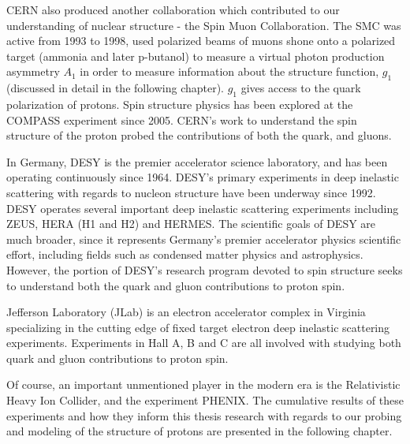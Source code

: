 CERN also produced another collaboration which contributed to our understanding
of nuclear structure - the Spin Muon Collaboration. The SMC was active from 1993
to 1998, used polarized beams of muons shone onto a polarized target (ammonia
and later p-butanol) to measure a virtual photon production asymmetry $A_1$ in
order to measure information about the structure function, $g_1$ (discussed in
detail in the following chapter). $g_1$ gives access to the quark polarization
of protons. Spin structure physics has been explored at the COMPASS experiment
since 2005. CERN's work to understand the spin structure of the proton probed
the contributions of both the quark, and gluons. 

In Germany, DESY is the premier accelerator science laboratory, and has been
operating continuously since 1964. DESY's primary experiments in deep inelastic
scattering with regards to nucleon structure have been underway since 1992. DESY
operates several important deep inelastic scattering experiments including ZEUS,
HERA (H1 and H2) and HERMES. The scientific goals of DESY are much broader,
since it represents Germany's premier accelerator physics scientific effort,
including fields such as condensed matter physics and astrophysics. However, the
portion of DESY's research program devoted to spin structure seeks to understand
both the quark and gluon contributions to proton spin.

Jefferson Laboratory (JLab) is an electron accelerator complex in Virginia
specializing in the cutting edge of fixed target electron deep inelastic
scattering experiments. Experiments in Hall A, B and C are all involved with
studying both quark and gluon contributions to proton spin.

Of course, an important unmentioned player in the modern era is the Relativistic
Heavy Ion Collider, and the experiment PHENIX. The cumulative results of these
experiments and how they inform this thesis research with regards to our probing
and modeling of the structure of protons  are presented in the following
chapter.
